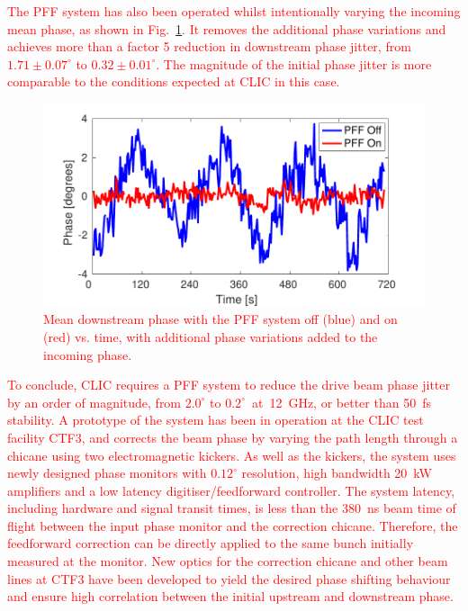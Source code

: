 \documentclass[%
 reprint,
superscriptaddress,
 amsmath,amssymb,
 prl,
]{revtex4-1}
\begin{document}
\textcolor{red}{The PFF system has also been operated 
whilst intentionally varying the incoming mean phase, as shown in 
Fig.~\ref{fig:wiggle}. It removes the additional phase variations 
and achieves more than a factor 5 reduction in downstream phase jitter, from 
\(1.71\pm0.07^\circ\) to \(0.32\pm0.01^\circ\). The magnitude of 
the initial phase jitter is more comparable to the conditions expected at CLIC 
in this case.}

\begin{figure}
	\includegraphics[width=\columnwidth]{figs/wiggle}
	\caption{\textcolor{red}{\label{fig:wiggle}Mean downstream phase with the 
	PFF system off 
		(blue) and on (red) vs. time, with additional phase variations added to 
		the 
		incoming phase.}}
\end{figure}

\textcolor{red}{To conclude, CLIC requires a PFF system to reduce the drive 
beam phase jitter 
by an order of magnitude, from \(2.0^\circ\) to \(0.2^\circ\)~at~12~GHz, or 
better than 50~fs stability. A prototype of the system has been 
in operation at the CLIC test facility CTF3, and corrects the beam phase by 
varying the path length through a chicane using two electromagnetic kickers. 
As well as the kickers, the system uses newly designed phase monitors with 
\(0.12^\circ\) resolution, high bandwidth 20~kW amplifiers and a low latency 
digitiser/feedforward controller. The system latency, including hardware and 
signal transit times, is less than the 380~ns beam time of flight between the 
input phase monitor and the correction chicane. Therefore, the feedforward 
correction can be directly applied to the same bunch initially measured at the 
monitor. New optics for the correction chicane and other beam lines at CTF3 
have been 
developed to yield the desired phase shifting behaviour and ensure high 
correlation between the initial upstream and downstream phase.}
\end{document}
